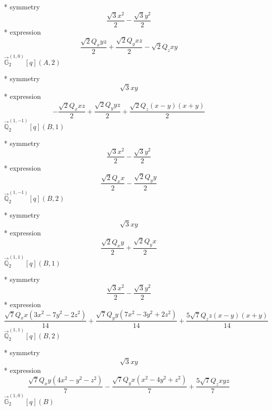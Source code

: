 \documentclass[fleqn,8pt]{jsarticle}
\begin{document}
\noindent\quad ** symmetry
\begin{dmath*}
\frac{\sqrt{3} x^{2}}{2} - \frac{\sqrt{3} y^{2}}{2}
\end{dmath*}
\noindent\quad ** expression
\begin{dmath*}
\frac{\sqrt{2} Q_{x} y z}{2} + \frac{\sqrt{2} Q_{y} x z}{2} - \sqrt{2} Q_{z} x y
\end{dmath*}
\noindent\quad $\vec{\mathbb{G}}_{2}^{(1,0)}[q](A,2)$

\noindent\quad ** symmetry
\begin{dmath*}
\sqrt{3} x y
\end{dmath*}
\noindent\quad ** expression
\begin{dmath*}
- \frac{\sqrt{2} Q_{x} x z}{2} + \frac{\sqrt{2} Q_{y} y z}{2} + \frac{\sqrt{2} Q_{z} \left(x - y\right) \left(x + y\right)}{2}
\end{dmath*}
\noindent\quad $\vec{\mathbb{Q}}_{2}^{(1,-1)}[q](B,1)$

\noindent\quad ** symmetry
\begin{dmath*}
\frac{\sqrt{3} x^{2}}{2} - \frac{\sqrt{3} y^{2}}{2}
\end{dmath*}
\noindent\quad ** expression
\begin{dmath*}
\frac{\sqrt{2} Q_{x} x}{2} - \frac{\sqrt{2} Q_{y} y}{2}
\end{dmath*}
\noindent\quad $\vec{\mathbb{Q}}_{2}^{(1,-1)}[q](B,2)$

\noindent\quad ** symmetry
\begin{dmath*}
\sqrt{3} x y
\end{dmath*}
\noindent\quad ** expression
\begin{dmath*}
\frac{\sqrt{2} Q_{x} y}{2} + \frac{\sqrt{2} Q_{y} x}{2}
\end{dmath*}
\noindent\quad $\vec{\mathbb{Q}}_{2}^{(1,1)}[q](B,1)$

\noindent\quad ** symmetry
\begin{dmath*}
\frac{\sqrt{3} x^{2}}{2} - \frac{\sqrt{3} y^{2}}{2}
\end{dmath*}
\noindent\quad ** expression
\begin{dmath*}
\frac{\sqrt{7} Q_{x} x \left(3 x^{2} - 7 y^{2} - 2 z^{2}\right)}{14} + \frac{\sqrt{7} Q_{y} y \left(7 x^{2} - 3 y^{2} + 2 z^{2}\right)}{14} + \frac{5 \sqrt{7} Q_{z} z \left(x - y\right) \left(x + y\right)}{14}
\end{dmath*}
\noindent\quad $\vec{\mathbb{Q}}_{2}^{(1,1)}[q](B,2)$

\noindent\quad ** symmetry
\begin{dmath*}
\sqrt{3} x y
\end{dmath*}
\noindent\quad ** expression
\begin{dmath*}
\frac{\sqrt{7} Q_{x} y \left(4 x^{2} - y^{2} - z^{2}\right)}{7} - \frac{\sqrt{7} Q_{y} x \left(x^{2} - 4 y^{2} + z^{2}\right)}{7} + \frac{5 \sqrt{7} Q_{z} x y z}{7}
\end{dmath*}
\noindent\quad $\vec{\mathbb{G}}_{2}^{(1,0)}[q](B)$
\end{document}
